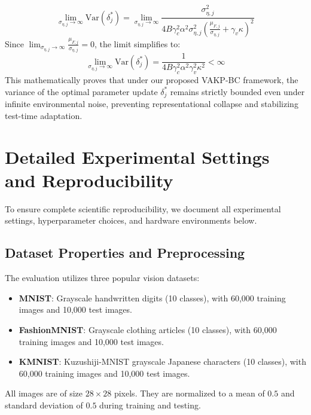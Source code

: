 \documentclass{article}
\theoremstyle{plain}
\theoremstyle{definition}
\theoremstyle{remark}
\begin{document}
\begin{equation}
    \lim_{\sigma_{\eta, j} \to \infty} \mathrm{Var}(\delta_j^*) = \lim_{\sigma_{\eta, j} \to \infty} \frac{\sigma_{\eta, j}^2}{4 B \gamma_c^2 \alpha^2 \sigma_{\eta, j}^2 \left( \frac{\mu_{F, j}}{\sigma_{\eta, j}} + \gamma_v \kappa \right)^2}
\end{equation}
Since $\lim_{\sigma_{\eta, j} \to \infty} \frac{\mu_{F, j}}{\sigma_{\eta, j}} = 0$, the limit simplifies to:
\begin{equation}
    \lim_{\sigma_{\eta, j} \to \infty} \mathrm{Var}(\delta_j^*) = \frac{1}{4 B \gamma_c^2 \alpha^2 \gamma_v^2 \kappa^2} < \infty
\end{equation}
This mathematically proves that under our proposed VAKP-BC framework, the variance of the optimal parameter update $\delta_j^*$ remains strictly bounded even under infinite environmental noise, preventing representational collapse and stabilizing test-time adaptation.

\section{Detailed Experimental Settings and Reproducibility}
\label{sec:appendix_settings}

To ensure complete scientific reproducibility, we document all experimental settings, hyperparameter choices, and hardware environments below.

\subsection{Dataset Properties and Preprocessing}
The evaluation utilizes three popular vision datasets:
\begin{itemize}
    \item \textbf{MNIST}: Grayscale handwritten digits (10 classes), with 60,000 training images and 10,000 test images.
    \item \textbf{FashionMNIST}: Grayscale clothing articles (10 classes), with 60,000 training images and 10,000 test images.
    \item \textbf{KMNIST}: Kuzushiji-MNIST grayscale Japanese characters (10 classes), with 60,000 training images and 10,000 test images.
\end{itemize}
All images are of size $28 \times 28$ pixels. They are normalized to a mean of $0.5$ and standard deviation of $0.5$ during training and testing.
\end{document}
